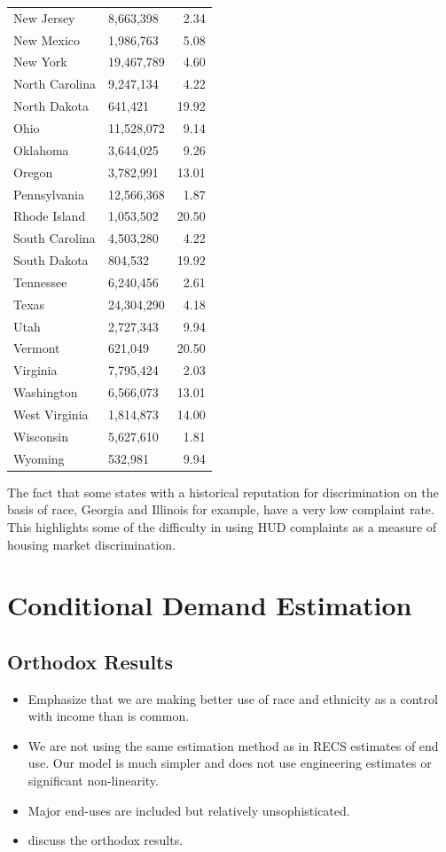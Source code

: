 \documentclass{article}
\begin{document}
\begin{table}[htbp]
{\begin{tabular}{llr}
  New Jersey & 8,663,398 & 2.34 \\ 
  New Mexico & 1,986,763 & 5.08 \\ 
  New York & 19,467,789 & 4.60 \\ 
  North Carolina & 9,247,134 & 4.22 \\ 
  North Dakota & 641,421 & 19.92 \\ 
  Ohio & 11,528,072 & 9.14 \\ 
  Oklahoma & 3,644,025 & 9.26 \\ 
  Oregon & 3,782,991 & 13.01 \\ 
  Pennsylvania & 12,566,368 & 1.87 \\ 
  Rhode Island & 1,053,502 & 20.50 \\ 
  South Carolina & 4,503,280 & 4.22 \\ 
  South Dakota & 804,532 & 19.92 \\ 
  Tennessee & 6,240,456 & 2.61 \\ 
  Texas & 24,304,290 & 4.18 \\ 
  Utah & 2,727,343 & 9.94 \\ 
  Vermont & 621,049 & 20.50 \\ 
  Virginia & 7,795,424 & 2.03 \\ 
  Washington & 6,566,073 & 13.01 \\ 
  West Virginia & 1,814,873 & 14.00 \\ 
  Wisconsin & 5,627,610 & 1.81 \\ 
  Wyoming & 532,981 & 9.94 \\ 
   \hline
\end{tabular}
}
\end{table}
The fact that some states with a historical reputation for discrimination on the basis of race, Georgia and Illinois for example, have a very low complaint rate.  This highlights some of the difficulty in using HUD complaints as a measure of housing market discrimination.

\section{Conditional Demand Estimation}

  \subsection{Orthodox Results}
  
  \begin{itemize}
    \item Emphasize that we are making better use of race and ethnicity as a control with income than is common.
    \item We are not using the same estimation method as in RECS estimates of end use.  Our model is much simpler and does not use engineering estimates or significant non-linearity.
    \item Major end-uses are included but relatively unsophisticated.
    \item discuss the orthodox results.
  \end{itemize}
  
\end{document}

